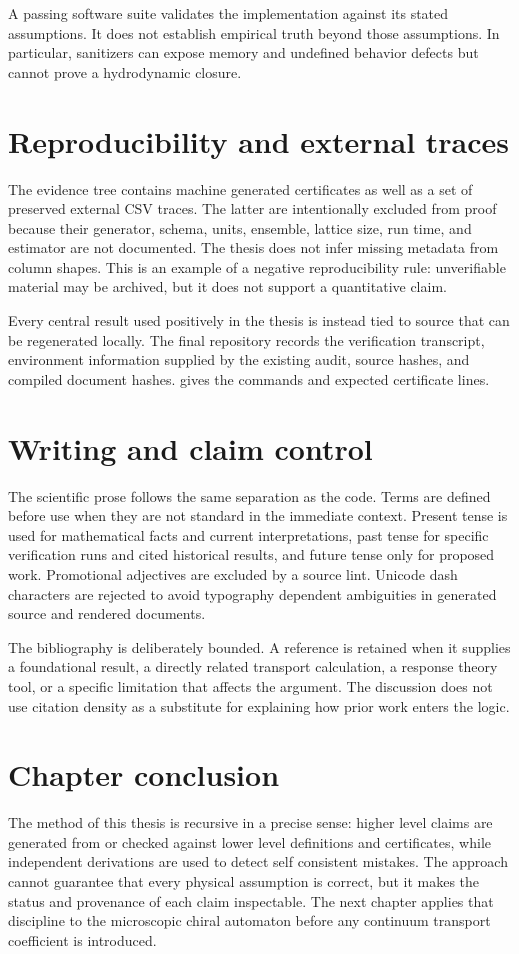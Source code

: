 A passing software suite validates the implementation against its stated assumptions. It does not establish empirical truth beyond those assumptions. In particular, sanitizers can expose memory and undefined behavior defects but cannot prove a hydrodynamic closure.

\section{Reproducibility and external traces}
The evidence tree contains machine generated certificates as well as a set of preserved external CSV traces. The latter are intentionally excluded from proof because their generator, schema, units, ensemble, lattice size, run time, and estimator are not documented. The thesis does not infer missing metadata from column shapes. This is an example of a negative reproducibility rule: unverifiable material may be archived, but it does not support a quantitative claim.

Every central result used positively in the thesis is instead tied to source that can be regenerated locally. The final repository records the verification transcript, environment information supplied by the existing audit, source hashes, and compiled document hashes.  gives the commands and expected certificate lines.

\section{Writing and claim control}
The scientific prose follows the same separation as the code. Terms are defined before use when they are not standard in the immediate context. Present tense is used for mathematical facts and current interpretations, past tense for specific verification runs and cited historical results, and future tense only for proposed work. Promotional adjectives are excluded by a source lint. Unicode dash characters are rejected to avoid typography dependent ambiguities in generated source and rendered documents.

The bibliography is deliberately bounded. A reference is retained when it supplies a foundational result, a directly related transport calculation, a response theory tool, or a specific limitation that affects the argument. The discussion does not use citation density as a substitute for explaining how prior work enters the logic.

\section{Chapter conclusion}
The method of this thesis is recursive in a precise sense: higher level claims are generated from or checked against lower level definitions and certificates, while independent derivations are used to detect self consistent mistakes. The approach cannot guarantee that every physical assumption is correct, but it makes the status and provenance of each claim inspectable. The next chapter applies that discipline to the microscopic chiral automaton before any continuum transport coefficient is introduced.
